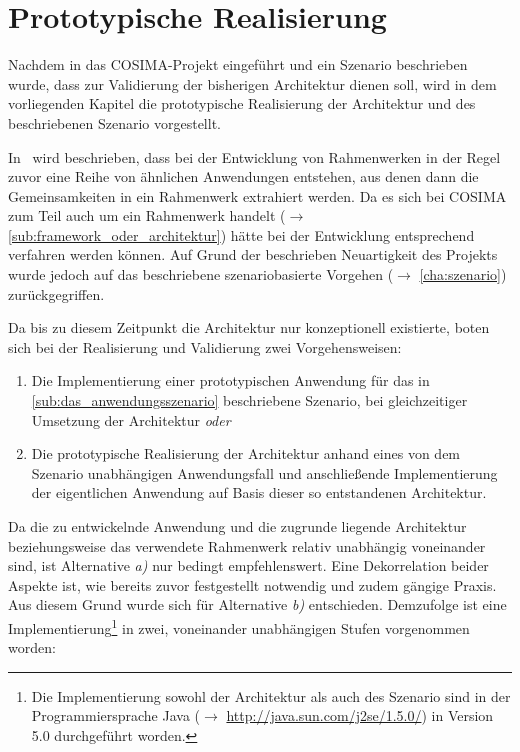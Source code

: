 
\chapter{Prototypische Realisierung} %
\label{cha:prototypische_realisierung}

  Nachdem in das COSIMA-Projekt eingeführt und ein Szenario beschrieben wurde, dass zur Validierung der bisherigen Architektur dienen soll, wird in dem vorliegenden Kapitel die prototypische Realisierung der Architektur und des beschriebenen Szenario vorgestellt.
  
  In~\citep{handbuch_der_software_architektur} wird beschrieben, dass bei der Entwicklung von Rahmenwerken in der Regel zuvor eine Reihe von ähnlichen Anwendungen entstehen, aus denen dann die Gemeinsamkeiten in ein Rahmenwerk extrahiert werden. Da es sich bei COSIMA zum Teil auch um ein Rahmenwerk handelt ($\to$ \ref{sub:framework_oder_architektur}) hätte bei der Entwicklung entsprechend verfahren werden können. Auf Grund der beschrieben Neuartigkeit des Projekts wurde jedoch auf das beschriebene szenariobasierte Vorgehen ($\to$ \ref{cha:szenario}) zurückgegriffen.
  
  Da bis zu diesem Zeitpunkt die Architektur nur konzeptionell existierte, boten sich bei der Realisierung und Validierung zwei Vorgehensweisen:

  \begin{enumerate}[\slshape a)]
    \item Die Implementierung einer prototypischen Anwendung für das in \ref{sub:das_anwendungsszenario} beschriebene Szenario, bei gleichzeitiger Umsetzung der Architektur \emph{oder}
    \item Die prototypische Realisierung der Architektur anhand eines von dem Szenario unabhängigen Anwendungsfall und anschließende Implementierung der eigentlichen Anwendung auf Basis dieser so entstandenen Architektur.
  \end{enumerate}
  
  Da die zu entwickelnde Anwendung und die zugrunde liegende Architektur beziehungsweise das verwendete Rahmenwerk relativ unabhängig voneinander sind, ist Alternative \emph{a)} nur bedingt empfehlenswert. Eine Dekorrelation beider Aspekte ist, wie bereits zuvor festgestellt notwendig und zudem gängige Praxis. Aus diesem Grund wurde sich für Alternative \emph{b)} entschieden. Demzufolge ist eine Implementierung\footnote{Die Implementierung sowohl der Architektur als auch des Szenario sind in der Programmiersprache Java ($\to$ \url{http://java.sun.com/j2se/1.5.0/}) in Version 5.0 durchgeführt worden.} in zwei, voneinander unabhängigen Stufen vorgenommen worden:
  
